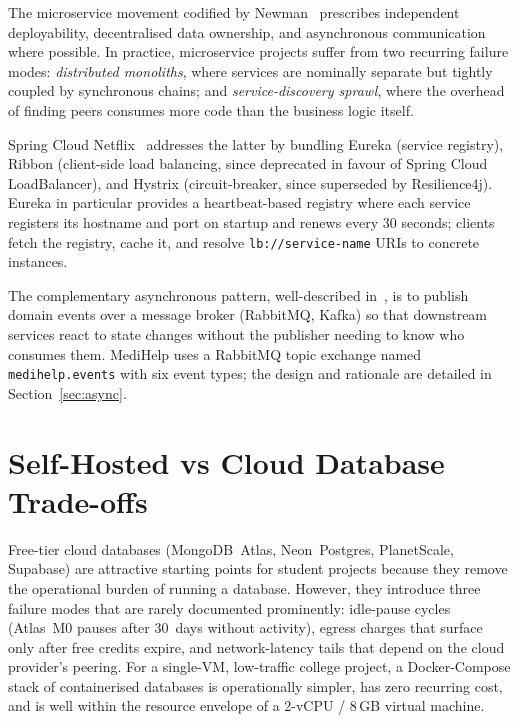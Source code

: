 \documentclass[12pt]{caltech_thesis}
\begin{document}
The microservice movement codified by Newman~\citep{newman2015building}
prescribes independent deployability, decentralised data ownership, and
asynchronous communication where possible. In practice, microservice
projects suffer from two recurring failure modes: \textit{distributed
monoliths}, where services are nominally separate but tightly coupled by
synchronous chains; and \textit{service-discovery sprawl}, where the
overhead of finding peers consumes more code than the business logic
itself.

Spring Cloud Netflix~\citep{springcloud} addresses the latter by bundling
Eureka (service registry), Ribbon (client-side load balancing, since
deprecated in favour of Spring Cloud LoadBalancer), and Hystrix
(circuit-breaker, since superseded by Resilience4j). Eureka in particular
provides a heartbeat-based registry where each service registers its
hostname and port on startup and renews every 30 seconds; clients fetch
the registry, cache it, and resolve \texttt{lb://service-name} URIs to
concrete instances.

The complementary asynchronous pattern, well-described
in~\citep{richardson2018microservices}, is to publish domain events over a
message broker (RabbitMQ, Kafka) so that downstream services react to
state changes without the publisher needing to know who consumes them.
MediHelp uses a RabbitMQ topic exchange named \texttt{medihelp.events}
with six event types; the design and rationale are detailed in
Section~\ref{sec:async}.

\section{Self-Hosted vs Cloud Database Trade-offs}

Free-tier cloud databases (MongoDB~Atlas, Neon~Postgres,
PlanetScale, Supabase) are attractive starting points for student
projects because they remove the operational burden of running a
database. However, they introduce three failure modes that are rarely
documented prominently: idle-pause cycles (Atlas~M0 pauses after 30~days
without activity), egress charges that surface only after free credits
expire, and network-latency tails that depend on the cloud provider's
peering. For a single-VM, low-traffic college project, a Docker-Compose
stack of containerised databases is operationally simpler, has zero
recurring cost, and is well within the resource envelope of a 2-vCPU /
8\,GB virtual machine.

\end{document}
